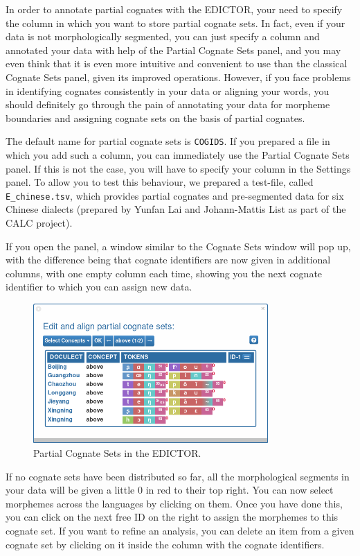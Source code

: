 \documentclass[a4paper,svgnames]{scrartcl}
\begin{document}
In order to annotate partial cognates with the EDICTOR, your need to
specify the column in which you want to store partial cognate sets. In
fact, even if your data is not morphologically segmented, you can just
specify a column and annotated your data with help of the Partial
Cognate Sets panel, and you may even think that it is even more
intuitive and convenient to use than the classical Cognate Sets panel,
given its improved operations. However, if you face problems in
identifying cognates consistently in your data or aligning your words,
you should definitely go through the pain of annotating your data for
morpheme boundaries and assigning cognate sets on the basis of partial
cognates.

The default name for partial cognate sets is \texttt{COGIDS}. If you
prepared a file in which you add such a column, you can immediately use
the Partial Cognate Sets panel. If this is not the case, you will have
to specify your column in the Settings panel. To allow you to test this
behaviour, we prepared a test-file, called \texttt{E\_chinese.tsv},
which provides partial cognates and pre-segmented data for six Chinese
dialects (prepared by Yunfan Lai and Johann-Mattis List as part of the
CALC project).

If you open the panel, a window similar to the Cognate Sets window will
pop up, with the difference being that cognate identifiers are now given
in additional columns, with one empty column each time, showing you the
next cognate identifier to which you can assign new data.

\begin{figure}
\centering
\includegraphics[width=0.8\textwidth]{images/figure-12.png}
\caption{Partial Cognate Sets in the EDICTOR.}
\end{figure}

If no cognate sets have been distributed so far, all the morphological
segments in your data will be given a little 0 in red to their top
right. You can now select morphemes across the languages by clicking on
them. Once you have done this, you can click on the next free ID on the
right to assign the morphemes to this cognate set. If you want to refine
an analysis, you can delete an item from a given cognate set by clicking
on it inside the column with the cognate identifiers.
\end{document}
